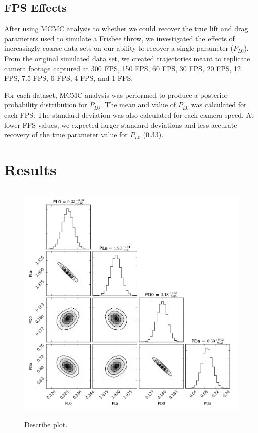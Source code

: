 \documentclass[a4paper,12pt, oneside]{article}
\begin{document}
\subsection{FPS Effects}
After using MCMC analysis to whether we could recover the true lift and drag parameters used to simulate a Frisbee throw, we investigated the effects of increasingly coarse data sets on our ability to recover a single parameter ($P_{L0}$). From the original simulated data set, we created trajectories meant to replicate camera footage captured at 300 FPS, 150 FPS, 60 FPS, 30 FPS, 20 FPS, 12 FPS, 7.5 FPS, 6 FPS, 4 FPS, and 1 FPS.

For each dataset, MCMC analysis was performed to produce a posterior probability distribution for $P_{L0}$. The mean and value of $P_{L0}$ was calculated for each FPS. The standard-deviation was also calculated for each camera speed. At lower FPS values, we expected larger standard deviations and less accurate recovery of the true parameter value for $P_{L0}$ (0.33).

\section{Results}

\begin{figure}[H]
        \includegraphics[width=12cm, height=12cm]{Final_PL0,PLa,PD0,PDa_nsteps=20,000_nwalkers=8}
	\centering
	\caption{\color{red} Describe plot.}
\end{figure}
\end{document}
